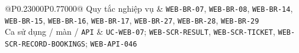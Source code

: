 \begin{longtable}{@{}P{0.23000\SRSWidth}P{0.77000\SRSWidth}@{}}
Quy tắc nghiệp vụ & \texttt{WEB-\allowbreak{}BR-\allowbreak{}07}, \texttt{WEB-\allowbreak{}BR-\allowbreak{}08}, \texttt{WEB-\allowbreak{}BR-\allowbreak{}14}, \texttt{WEB-\allowbreak{}BR-\allowbreak{}15}, \texttt{WEB-\allowbreak{}BR-\allowbreak{}16}, \texttt{WEB-\allowbreak{}BR-\allowbreak{}17}, \texttt{WEB-\allowbreak{}BR-\allowbreak{}27}, \texttt{WEB-\allowbreak{}BR-\allowbreak{}28}, \texttt{WEB-\allowbreak{}BR-\allowbreak{}29} \\[3pt]
Ca sử dụng /\allowbreak{} màn /\allowbreak{} \texttt{API} & \texttt{UC-\allowbreak{}WEB-\allowbreak{}07}; \texttt{WEB-\allowbreak{}SCR-\allowbreak{}RESULT}, \texttt{WEB-\allowbreak{}SCR-\allowbreak{}TICKET}, \texttt{WEB-\allowbreak{}SCR-\allowbreak{}RECORD-\allowbreak{}BOOKINGS\allowbreak{}}; \texttt{WEB-\allowbreak{}API-\allowbreak{}046} \\[3pt]
\end{longtable}
\endgroup

